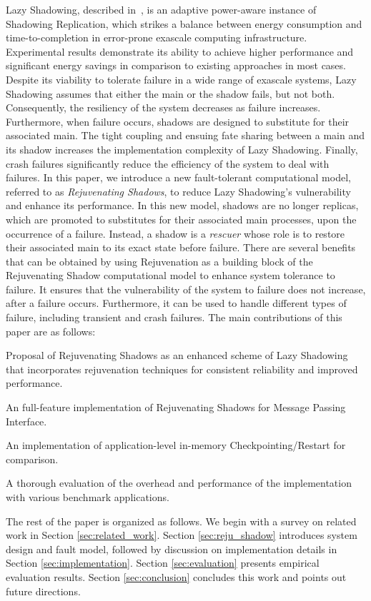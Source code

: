 Lazy Shadowing, described in~\cite{cui_2016_scalcom}, is an adaptive power-aware instance of Shadowing Replication, which strikes a balance between energy consumption and time-to-completion in error-prone exascale computing infrastructure. Experimental results demonstrate its ability to achieve higher performance and significant energy savings in comparison to existing approaches in most cases. Despite its viability to tolerate failure in a wide range of exascale systems, Lazy Shadowing assumes that either the main or the shadow fails, but not both. Consequently, the resiliency of the system decreases as failure increases. Furthermore, when failure occurs, shadows are designed to substitute for their associated main. The tight coupling and ensuing fate sharing between a main and its shadow increases the implementation complexity of Lazy Shadowing. Finally, crash failures significantly reduce the efficiency of the system to deal with failures. In this paper, we introduce a new fault-tolerant computational model, referred to as {\it Rejuvenating Shadows}, to reduce Lazy Shadowing's vulnerability and enhance its performance. In this new model, shadows are no longer replicas, which are promoted to substitutes for their associated main processes, upon the occurrence of a failure. Instead, a shadow is a {\it rescuer} whose role is to restore their associated main to its exact state before failure. 
There are several benefits that can be obtained by using Rejuvenation as a building block of the Rejuvenating Shadow computational model to enhance system tolerance to failure. It ensures that the vulnerability of the system to failure does not increase, after a failure occurs. Furthermore, it can be used to handle different types of failure, including transient and crash failures. The main contributions of this paper are as follows:


\begin{itemize}
{
   \item Proposal of Rejuvenating Shadows as an enhanced scheme of Lazy Shadowing that incorporates rejuvenation techniques for consistent reliability and improved performance.
   \item An full-feature implementation of Rejuvenating Shadows for Message Passing Interface.
   \item An implementation of application-level in-memory Checkpointing/Restart for comparison.
   \item A thorough evaluation of the overhead and performance of the implementation with various benchmark applications.
}
\end{itemize}

The rest of the paper is organized as follows. We begin with a survey on related work in Section 
\ref{sec:related_work}. Section \ref{sec:reju_shadow} introduces system design and fault model, followed by discussion on implementation details in Section \ref{sec:implementation}.
Section \ref{sec:evaluation} presents empirical evaluation results. Section \ref{sec:conclusion} concludes this work and points out future directions.



